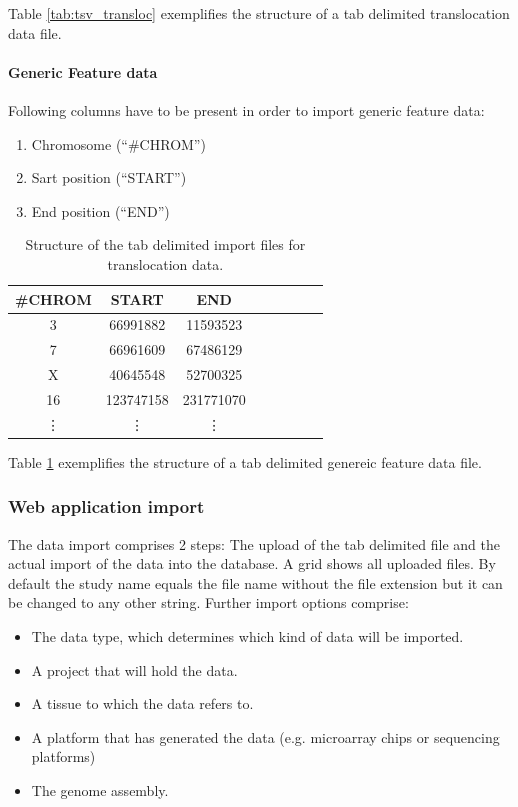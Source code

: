 \documentclass[11pt,final]{article}
\begin{document}
Table \ref{tab:tsv_transloc} exemplifies the structure of a tab delimited
translocation data file.

\paragraph{Generic Feature data}

Following columns have to be present in order to import generic feature data:

\begin{enumerate}
  \item Chromosome (``\#CHROM'')
  \item Sart position (``START'')
  \item End position (``END'')
\end{enumerate}

\begin{table}
	\centering
	\begin{tabular}[h]{|c|c|c|c|c|c|c|c|}
	  \hline
	  \#CHROM & START & END \\ \hline
	 3 & 66991882 & 11593523 \\
         7 & 66961609 & 67486129 \\
         X & 40645548 & 52700325 \\
         16 & 123747158 & 231771070 \\
	 \vdots & \vdots & \vdots \\
	\end{tabular}
	\caption{Structure of the tab delimited import files for translocation
	data.}
	\label{tab:tsv_gen}
\end{table}

Table \ref{tab:tsv_gen} exemplifies the structure of a tab delimited
genereic feature data file.

\subsubsection{Web application import}

The data import comprises 2 steps: The upload of the tab delimited file and
the actual import of the data into the database. A grid shows all uploaded
files. By default the study name equals the file name without the file
extension but it can be changed to any other string.
Further import options comprise: 

\begin{itemize}
  \item The data type, which determines which kind of data will be imported.
  \item A project that will hold the data.
  \item A tissue to which the data refers to.
  \item A platform that has generated the data (e.g. microarray chips or
        sequencing platforms)
  \item The genome assembly.
\end{itemize}
\end{document}
